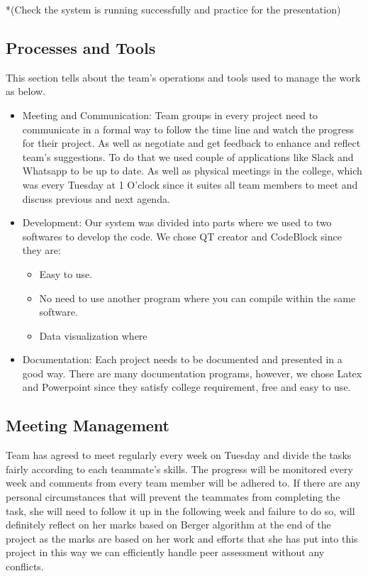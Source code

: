 \documentclass{article}
\begin{document}
*(Check the system is running successfully and practice for the presentation) 
 


\subsection{Processes and Tools}

This section tells about the team's operations and tools used to manage the work as below.   
\begin{itemize}

\item Meeting and Communication: Team groups in every project need to communicate in a formal way to follow the time line and watch the progress for their project. As well as negotiate and get feedback to enhance and reflect team’s suggestions. To do that we used couple of applications like Slack and Whatsapp to be up to date. As well as physical meetings in the college, which was every Tuesday at 1 O’clock since it suites all team members to meet and discuss previous and next agenda. 
\item Development: Our system was divided into parts where we used to two softwares to develop the code. We chose QT creator and CodeBlock since they are:
\begin{itemize}
\item 	Easy to use.
\item	No need to use another program where you can compile within the same software.
\item Data visualization where 

\end{itemize}
\item Documentation: Each project needs to be documented and presented in a good way. There are many documentation programs, however, we chose Latex and Powerpoint since they satisfy college requirement, free and easy to use. 

\end{itemize}



\subsection{Meeting Management} 
Team has agreed to meet regularly every week on Tuesday and divide the tasks fairly according to each teammate's skills. The progress will be monitored every week and comments from every team member will be adhered to. \newline If there are any personal circumstances that will prevent the teammates from completing the task, she will need to follow it up in the following week and failure to do so, will definitely reflect on her marks based on Berger algorithm at the end of the project as the marks are based on her work and efforts that she has put into this project in this way we can efficiently handle peer assessment without any conflicts. 
\end{document}
